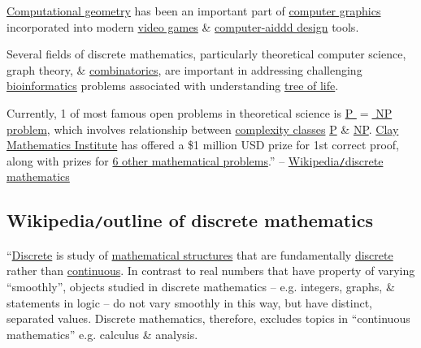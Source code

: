 \documentclass{article}
\begin{document}
\href{https://en.wikipedia.org/wiki/Computational_geometry}{Computational geometry} has been an important part of \href{https://en.wikipedia.org/wiki/Computer_graphics_(computer_science)}{computer graphics} incorporated into modern \href{https://en.wikipedia.org/wiki/Video_game}{video games} \& \href{https://en.wikipedia.org/wiki/Computer-aided_design}{computer-aiddd design} tools.

Several fields of discrete mathematics, particularly theoretical computer science, graph theory, \& \href{https://en.wikipedia.org/wiki/Combinatorics}{combinatorics}, are important in addressing challenging \href{https://en.wikipedia.org/wiki/Bioinformatics}{bioinformatics} problems associated with understanding \href{https://en.wikipedia.org/wiki/Phylogenetic_tree}{tree of life}.

Currently, 1 of most famous open problems in theoretical science is \href{https://en.wikipedia.org/wiki/P_%3D_NP_problem}{P $=$ NP problem}, which involves relationship between \href{https://en.wikipedia.org/wiki/Complexity_class}{complexity classes} \href{https://en.wikipedia.org/wiki/P_(complexity)}{P} \& \href{https://en.wikipedia.org/wiki/NP_(complexity)}{NP}. \href{https://en.wikipedia.org/wiki/Clay_Mathematics_Institute}{Clay Mathematics Institute} has offered a \$1 million USD prize for 1st correct proof, along with prizes for \href{https://en.wikipedia.org/wiki/Millennium_Prize_Problems}{6 other mathematical problems}.'' -- \href{https://en.wikipedia.org/wiki/Discrete_mathematics}{Wikipedia{\tt/}discrete mathematics}


\subsection{Wikipedia{\tt/}outline of discrete mathematics}
``\href{https://en.wikipedia.org/wiki/Discrete_mathematics}{Discrete} is study of \href{https://en.wikipedia.org/wiki/Mathematical_structure}{mathematical structures} that are fundamentally \href{https://en.wikipedia.org/wiki/Discrete_space}{discrete} rather than \href{https://en.wikipedia.org/wiki/Continuous_function}{continuous}. In contrast to real numbers that have property of varying ``smoothly'', objects studied in discrete mathematics -- e.g. integers, graphs, \& statements in logic -- do not vary smoothly in this way, but have distinct, separated values. Discrete mathematics, therefore, excludes topics in ``continuous mathematics'' e.g. calculus \& analysis.
\end{document}
